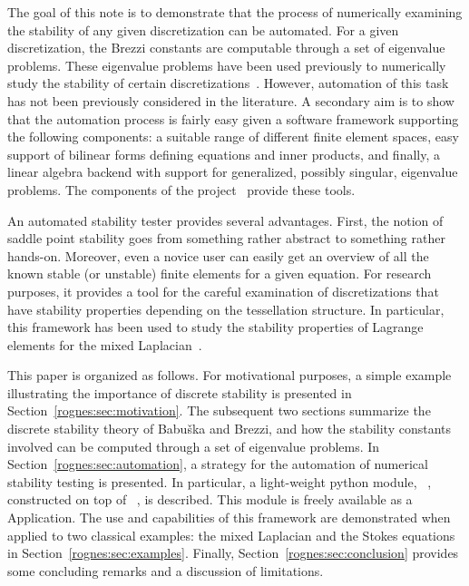 The goal of this note is to demonstrate that the process of
numerically examining the stability of any given discretization can be
automated. For a given discretization, the Brezzi constants are
computable through a set of eigenvalue problems. These eigenvalue
problems have been used previously to numerically study the stability
of certain discretizations~\cite{ArnoldRognes2009, ChapelleBathe1993,
  Qin1994}. However, automation of this task has not been previously
considered in the literature. A secondary aim is to show that the
automation process is fairly easy given a software framework
supporting the following components: a suitable range of different
finite element spaces, easy support of bilinear forms defining
equations and inner products, and finally, a linear algebra backend
with support for generalized, possibly singular, eigenvalue
problems. The components of the \fenics{} project~\cite{www:fenics}
provide these tools.

An automated stability tester provides several advantages. First, the
notion of saddle point stability goes from something rather abstract
to something rather hands-on.  Moreover, even a novice user can easily
get an overview of all the known stable (or unstable) finite elements
for a given equation. For research purposes, it provides a tool for
the careful examination of discretizations that have stability
properties depending on the tessellation structure. In particular,
this framework has been used to study the stability properties of
Lagrange elements for the mixed Laplacian~\cite{ArnoldRognes2009}.

This paper is organized as follows. For motivational purposes, a
simple example illustrating the importance of discrete stability is
presented in Section~\ref{rognes:sec:motivation}. The subsequent two
sections summarize the discrete stability theory of Babu\v ska and
Brezzi, and how the stability constants involved can be computed
through a set of eigenvalue problems. In
Section~\ref{rognes:sec:automation}, a strategy for the automation of
numerical stability testing is presented. In particular, a
light-weight python module, \ascot{}~\cite{www:ascot}, constructed on
top of \pydolfin{}~\cite{LoggWells2009}, is described. This module is
freely available as a\fenics{} Application. The use and capabilities
of this framework are demonstrated when applied to two classical
examples: the mixed Laplacian and the Stokes equations in
Section~\ref{rognes:sec:examples}.  Finally,
Section~\ref{rognes:sec:conclusion} provides some concluding remarks
and a discussion of limitations.

